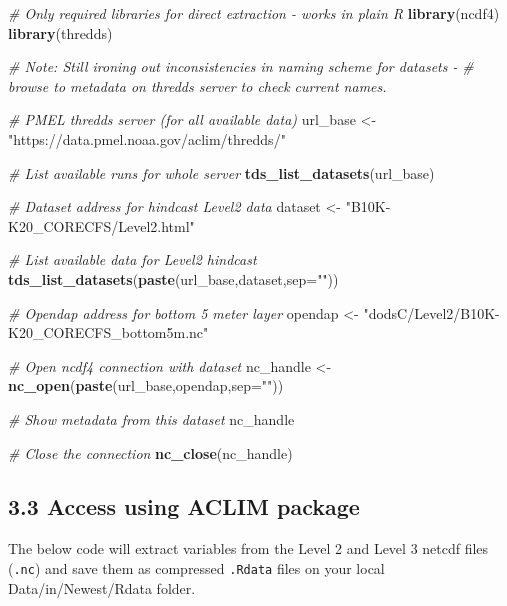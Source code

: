 \documentclass[
]{article}
\newenvironment{Shaded}{\begin{snugshade}}{\end{snugshade}}
\newcommand{\CommentTok}[1]{\textcolor[rgb]{0.56,0.35,0.01}{\textit{#1}}}
\newcommand{\DataTypeTok}[1]{\textcolor[rgb]{0.13,0.29,0.53}{#1}}
\newcommand{\KeywordTok}[1]{\textcolor[rgb]{0.13,0.29,0.53}{\textbf{#1}}}
\newcommand{\NormalTok}[1]{#1}
\newcommand{\StringTok}[1]{\textcolor[rgb]{0.31,0.60,0.02}{#1}}
\begin{document}
\begin{Shaded}
\begin{Highlighting}[]
    \CommentTok{# Only required libraries for direct extraction - works in plain R}
    \KeywordTok{library}\NormalTok{(ncdf4)}
    \KeywordTok{library}\NormalTok{(thredds)                          }

    \CommentTok{# Note: Still ironing out inconsistencies in naming scheme for datasets -}
    \CommentTok{# browse to metadata on thredds server to check current names.}

    \CommentTok{# PMEL thredds server (for all available data)}
\NormalTok{    url_base <-}\StringTok{ "https://data.pmel.noaa.gov/aclim/thredds/"}

    \CommentTok{# List available runs for whole server}
    \KeywordTok{tds_list_datasets}\NormalTok{(url_base)}

    \CommentTok{# Dataset address for hindcast Level2 data}
\NormalTok{    dataset  <-}\StringTok{ "B10K-K20_CORECFS/Level2.html"}
 
    \CommentTok{# List available data for Level2 hindcast}
    \KeywordTok{tds_list_datasets}\NormalTok{(}\KeywordTok{paste}\NormalTok{(url_base,dataset,}\DataTypeTok{sep=}\StringTok{""}\NormalTok{))}

    \CommentTok{# Opendap address for bottom 5 meter layer}
\NormalTok{    opendap  <-}\StringTok{ "dodsC/Level2/B10K-K20_CORECFS_bottom5m.nc"}

    \CommentTok{# Open ncdf4 connection with dataset}
\NormalTok{    nc_handle <-}\StringTok{ }\KeywordTok{nc_open}\NormalTok{(}\KeywordTok{paste}\NormalTok{(url_base,opendap,}\DataTypeTok{sep=}\StringTok{""}\NormalTok{)) }

    \CommentTok{# Show metadata from this dataset}
\NormalTok{    nc_handle}

    \CommentTok{# Close the connection}
    \KeywordTok{nc_close}\NormalTok{(nc_handle)}
\end{Highlighting}
\end{Shaded}

\hypertarget{access-using-aclim-package}{%
\subsection{3.3 Access using ACLIM
package}\label{access-using-aclim-package}}

The below code will extract variables from the Level 2 and Level 3
netcdf files (\texttt{.nc}) and save them as compressed \texttt{.Rdata}
files on your local Data/in/Newest/Rdata folder.
\end{document}
